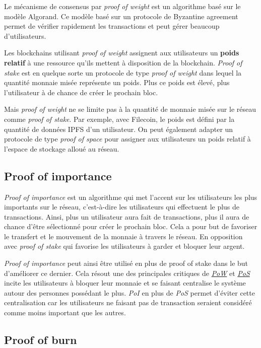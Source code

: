 Le mécanisme de consensus par \textit{proof of weight} est un algorithme basé sur le modèle Algorand. Ce modèle basé sur un protocole de Byzantine agreement permet de vérifier rapidement les transactions et peut gérer beaucoup d'utilisateurs. 

Les blockchains utilisant \textit{proof of weight} assignent aux utilisateurs un \textbf{poids relatif} à une ressource qu'ils mettent à disposition de la blockchain. \textit{Proof of stake} est en quelque sorte un protocole de type \textit{proof of weight} dans lequel la quantité monnaie misée représente un poids. Plus ce poids est élevé, plus l'utilisateur à de chance de créer le prochain bloc.

Mais \textit{proof of weight} ne se limite pas à la quantité de monnaie misée sur le réseau comme \textit{proof of stake}. Par exemple, avec Filecoin, le poids est défini par la quantité de données IPFS d'un utilisateur. On peut également adapter un protocole de type \textit{proof of space} pour assigner aux utilisateurs un poids relatif à l'espace de stockage alloué au réseau.

\subsection{Proof of importance}

\textit{Proof of importance} est un algorithme qui met l'accent sur les utilisateurs les plus importants sur le réseau, c'est-à-dire les utilisateurs qui effectuent le plus de transactions. Ainsi, plus un utilisateur aura fait de transactions, plus il aura de chance d'être sélectionné pour créer le prochain bloc. Cela a pour but de favoriser le transfert et le mouvement de la monnaie à travers le réseau. En opposition avec \textit{proof of stake} qui favorise les utilisateurs à garder et bloquer leur argent.

\textit{Proof of importance} peut ainsi être utilisé en plus de proof of stake dans le but d'améliorer ce dernier. Cela résout une des principales critiques de \hyperref[consensus:pow]{\textit{PoW}} et \hyperref[consensus:pos]{\textit{PoS}} incite les utilisateurs à bloquer leur monnaie et se faisant centralise le système autour des personnes possédant le plus. \textit{PoI} en plus de \textit{PoS} permet d'éviter cette centralisation car les utilisateurs ne faisant pas de transaction seraient considéré comme moins important que les autres.

\subsection{Proof of burn}

